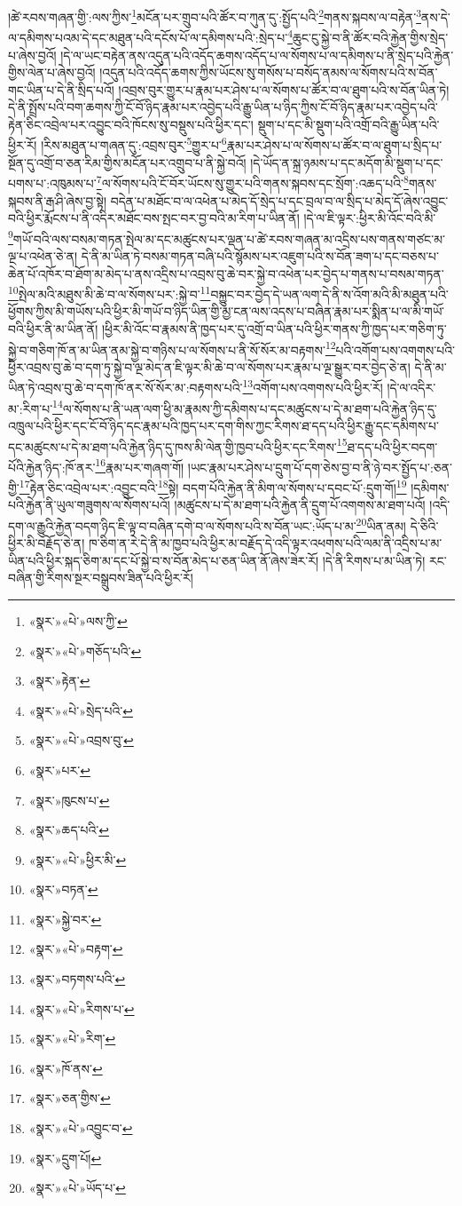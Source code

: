 །ཚེ་རབས་གཞན་གྱི་:ལས་ཀྱིས་\footnote{«སྣར་»«པེ་»ལས་ཀྱི་}མངོན་པར་གྲུབ་པའི་ཚོར་བ་ཀུན་དུ་:སྤྱོད་པའི་\footnote{«སྣར་»«པེ་»གཅོད་པའི་}གནས་སྐབས་ལ་བརྟེན་\footnote{«སྣར་»རྟེན་}ནས་དེ་ལ་དམིགས་པའམ་དེ་དང་མཐུན་པའི་དངོས་པོ་ལ་དམིགས་པའི་:སྲེད་པ་\footnote{«སྣར་»«པེ་»སྲེད་པའི་}ཆུང་ངུ་སྐྱེ་བ་ནི་ཚོར་བའི་རྐྱེན་གྱིས་སྲེད་པ་ཞེས་བྱའོ། །དེ་ལ་ཡང་བརྟེན་ནས་འདུན་པའི་འདོད་ཆགས་འདོད་པ་ལ་སོགས་པ་ལ་དམིགས་པ་ནི་སྲེད་པའི་རྐྱེན་གྱིས་ལེན་པ་ཞེས་བྱའོ། །འདུན་པའི་འདོད་ཆགས་ཀྱིས་ཡོངས་སུ་གསོས་པ་བསོད་ནམས་ལ་སོགས་པའི་ས་བོན་གང་ཡིན་པ་དེ་ནི་སྲིད་པའོ། །འབྲས་བུར་གྱུར་པ་རྣམ་པར་ཤེས་པ་ལ་སོགས་པ་ཚོར་བ་ལ་ཐུག་པའི་ས་བོན་ཡིན་ཏེ། དེ་ནི་སྤྲོས་པའི་བག་ཆགས་ཀྱི་ངོ་བོ་ཉིད་རྣམ་པར་འབྱེད་པའི་རྒྱུ་ཡིན་པ་ཉིད་ཀྱིས་ངོ་བོ་ཉིད་རྣམ་པར་འབྱེད་པའི་རྟེན་ཅིང་འབྲེལ་པར་འབྱུང་བའི་ཁོངས་སུ་བསྡུས་པའི་ཕྱིར་དང་། སྡུག་པ་དང་མི་སྡུག་པའི་འགྲོ་བའི་རྒྱུ་ཡིན་པའི་ཕྱིར་རོ། །རིས་མཐུན་པ་གཞན་དུ་:འབྲས་བུར་\footnote{«སྣར་»«པེ་»འབྲས་བུ་}གྱུར་པ་\footnote{«སྣར་»པར་}རྣམ་པར་ཤེས་པ་ལ་སོགས་པ་ཚོར་བ་ལ་ཐུག་པ་སྲིད་པ་སྔོན་དུ་འགྲོ་བ་ཅན་རིམ་གྱིས་མངོན་པར་འགྲུབ་པ་ནི་སྐྱེ་བའོ། །དེ་ཡོད་ན་སྐྲ་ཉམས་པ་དང་མདོག་མི་སྡུག་པ་དང་པགས་པ་:འཁུམས་པ་\footnote{«སྣར་»ཁུངས་པ་}ལ་སོགས་པའི་ངོ་བོར་ཡོངས་སུ་གྱུར་པའི་གནས་སྐབས་དང་སྲོག་:འཆད་པའི་\footnote{«སྣར་»ཆད་པའི་}གནས་སྐབས་ནི་རྒ་ཤི་ཞེས་བྱ་སྟེ། བདེན་པ་མཐོང་བ་ལ་འཕེན་པ་མེད་དོ་སྲེད་པ་དང་བྲལ་བ་ལ་སྲིད་པ་མེད་དོ་ཞེས་འབྱུང་བའི་ཕྱིར་རྨོངས་པ་ནི་འདིར་མཐོང་བས་སྤང་བར་བྱ་བའི་མ་རིག་པ་ཡིན་ནོ། །དེ་ལ་ཇི་ལྟར་:ཕྱིར་མི་འོང་བའི་མི་\footnote{«སྣར་»«པེ་»ཕྱིར་མི་}གཡོ་བའི་ལས་བསམ་གཏན་སྤེལ་མ་དང་མཚུངས་པར་ལྡན་པ་ཚེ་རབས་གཞན་མ་འདྲིས་པས་གནས་གཙང་མ་ལྔ་པ་འཕེན་ཅེ་ན། དེ་ནི་མ་ཡིན་ཏེ་བསམ་གཏན་བཞི་པའི་སྙོམས་པར་འཇུག་པའི་ས་བོན་ཟག་པ་དང་བཅས་པ་ཆེན་པོ་འཁོར་བ་ཐོག་མ་མེད་པ་ནས་འདྲིས་པ་འབྲས་བུ་ཆེ་བར་སྐྱེ་བ་འཕེན་པར་བྱེད་པ་གནས་པ་བསམ་གཏན་\footnote{«སྣར་»བཏན་}སྤེལ་མའི་མཐུས་མི་ཆེ་བ་ལ་སོགས་པར་:སྐྱེ་བ་\footnote{«སྣར་»སྐྱེ་བར་}བསྐྱུང་བར་བྱེད་དེ་ཡན་ལག་དེ་ནི་ས་འོག་མའི་མི་མཐུན་པའི་ཕྱོགས་ཀྱིས་མི་གཡོས་པའི་ཕྱིར་མི་གཡོ་བ་ཉིད་ཡིན་གྱི་མྱ་ངན་ལས་འདས་པ་བཞིན་རྣམ་པར་སྨིན་པ་ལ་མི་གཡོ་བའི་ཕྱིར་ནི་མ་ཡིན་ནོ། །ཕྱིར་མི་འོང་བ་རྣམས་ནི་ཁྱད་པར་དུ་འགྲོ་བ་ཡིན་པའི་ཕྱིར་གནས་ཀྱི་ཁྱད་པར་གཅིག་ཏུ་སྐྱེ་བ་གཅིག་ཁོ་ན་མ་ཡིན་ནམ་སྐྱེ་བ་གཉིས་པ་ལ་སོགས་པ་ནི་སོ་སོར་མ་བརྟགས་\footnote{«སྣར་»«པེ་»བརྟག་}པའི་འགོག་པས་འགགས་པའི་ཕྱིར་འབྲས་བུ་ཆེ་བ་དག་ཏུ་སྐྱེ་བ་ལྔ་མེད་ན་ཇི་ལྟར་མི་ཆེ་བ་ལ་སོགས་པར་རྣམ་པ་ལྔ་སྒྱུར་བར་བྱེད་ཅེ་ན། དེ་ནི་མ་ཡིན་ཏེ་འབྲས་བུ་ཆེ་བ་དག་ཁོ་ནར་སོ་སོར་མ་:བརྟགས་པའི་\footnote{«སྣར་»བཏགས་པའི་}འགོག་པས་འགགས་པའི་ཕྱིར་རོ། །དེ་ལ་འདིར་མ་:རིག་པ་\footnote{«སྣར་»«པེ་»རིགས་པ་}ལ་སོགས་པ་ནི་ཡན་ལག་ཕྱི་མ་རྣམས་ཀྱི་དམིགས་པ་དང་མཚུངས་པ་དེ་མ་ཐག་པའི་རྐྱེན་ཉིད་དུ་འཁྲུལ་པའི་ཕྱིར་དང་ངོ་བོ་ཉིད་དང་རྣམ་པའི་ཁྱད་པར་དག་གིས་ཀྱང་རིགས་ཐ་དད་པའི་ཕྱིར་རྒྱུ་དང་དམིགས་པ་དང་མཚུངས་པ་དེ་མ་ཐག་པའི་རྐྱེན་ཉིད་དུ་ཁས་མི་ལེན་གྱི་ཁྱབ་པའི་ཕྱིར་དང་རིགས་\footnote{«སྣར་»«པེ་»རིག་}ཐ་དད་པའི་ཕྱིར་བདག་པོའི་རྐྱེན་ཉིད་:ཁོ་ནར་\footnote{«སྣར་»ཁོ་ནས་}རྣམ་པར་གཞག་གོ། །ཡང་རྣམ་པར་ཤེས་པ་དྲུག་པོ་དག་ཅེས་བྱ་བ་ནི་ཉེ་བར་སྤྱོད་པ་:ཅན་གྱི་\footnote{«སྣར་»ཅན་གྱིས་}རྟེན་ཅིང་འབྲེལ་པར་:འབྱུང་བའི་\footnote{«སྣར་»«པེ་»འབྱུང་བ་}སྟེ། བདག་པོའི་རྐྱེན་ནི་མིག་ལ་སོགས་པ་དབང་པོ་:དྲུག་གོ།\footnote{«སྣར་»དྲུག་པོ།} །དམིགས་པའི་རྐྱེན་ནི་ཡུལ་གཟུགས་ལ་སོགས་པའོ། །མཚུངས་པ་དེ་མ་ཐག་པའི་རྐྱེན་ནི་དྲུག་པོ་འགགས་མ་ཐག་པའོ། །འདི་དག་ལ་རྒྱུའི་རྐྱེན་བདག་ཉིད་ཇི་ལྟ་བ་བཞིན་དགེ་བ་ལ་སོགས་པའི་ས་བོན་ཡང་:ཡོད་པ་མ་\footnote{«སྣར་»«པེ་»ཡོད་པ་}ཡིན་ནམ། དེ་ཅིའི་ཕྱིར་མི་བརྗོད་ཅེ་ན། ཁ་ཅིག་ན་རེ་དེ་ནི་མ་ཁྱབ་པའི་ཕྱིར་མ་བརྗོད་དེ་འདི་ལྟར་འཕགས་པའི་ལམ་ནི་འདྲིས་པ་མ་ཡིན་པའི་ཕྱིར་སྐད་ཅིག་མ་དང་པོ་སྐྱེ་བ་ས་བོན་མེད་པ་ཅན་ཡིན་ནོ་ཞེས་ཟེར་རོ། །དེ་ནི་རིགས་པ་མ་ཡིན་ཏེ། རང་བཞིན་གྱི་རིགས་སྔར་བསྒྲུབས་ཟིན་པའི་ཕྱིར་རོ། 